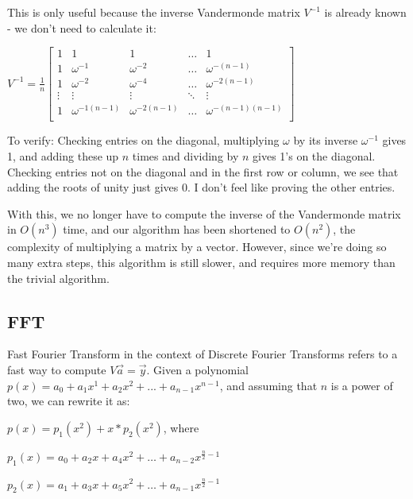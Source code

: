 \documentclass{article}
\begin{document}
This is only useful because the inverse Vandermonde matrix $V^{-1}$ is already known - we don't need to calculate it:

\centerline{
    $ V^{-1} = \displaystyle\frac{1}{n}
    \begin{bmatrix}
        1 & 1 & 1 & \ldots & 1 \\
        1 & \omega^{-1} & \omega^{-2} & \ldots & \omega^{-(n-1)} \\
        1 & \omega^{-2} & \omega^{-4} & \ldots & \omega^{-2(n-1)} \\
        \vdots & \vdots & \vdots & \ddots & \vdots \\
        1 & \omega^{-1(n-1)} & \omega^{-2(n-1)} & \ldots & \omega^{-(n-1)(n-1)} \\
    \end{bmatrix}
    $
}

To verify: Checking entries on the diagonal, multiplying $\omega$ by its inverse $\omega^{-1}$ gives 1, and adding these up $n$ times and dividing by $n$ gives 1's on the diagonal. Checking entries not on the diagonal and in the first row or column, we see that adding the roots of unity just gives 0. I don't feel like proving the other entries.

With this, we no longer have to compute the inverse of the Vandermonde matrix in $O(n^3)$ time, and our algorithm has been shortened to $O(n^2)$, the complexity of multiplying a matrix by a vector. However, since we're doing so many extra steps, this algorithm is still slower, and requires more memory than the trivial algorithm.

\subsection{FFT}
Fast Fourier Transform in the context of Discrete Fourier Transforms refers to a fast way to compute $V\vec{a}=\vec{y}$. Given a polynomial $p(x)=a_0 + a_1x^1 + a_2x^2 + ... + a_{n-1}x^{n-1}$, and assuming that $n$ is a power of two, we can rewrite it as:

\begin{center}
    $p(x) = p_1(x^2) + x * p_2(x^2)$, where

    $p_1(x) = a_0 + a_2x + a_4x^2 + \ldots + a_{n-2}x^{\frac{n}{2}-1}$

    $p_2(x) = a_1 + a_3x + a_5x^2 + \ldots + a_{n-1}x^{\frac{n}{2}-1}$
\end{center}
\end{document}
